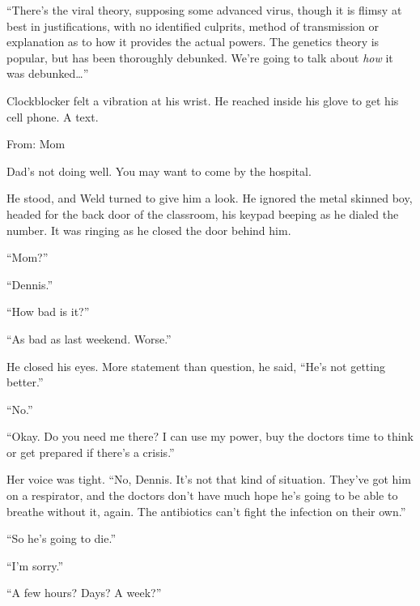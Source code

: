 ``There's the viral theory, supposing some advanced virus, though it is flimsy at best in justifications, with no identified culprits, method of transmission or explanation as to how it provides the actual powers.  The genetics theory is popular, but has been thoroughly debunked.  We're going to talk about \emph{how} it was debunked\ldots''



Clockblocker felt a vibration at his wrist.  He reached inside his glove to get his cell phone.  A text.



From: Mom



Dad's not doing well.  You may want to come by the hospital.



He stood, and Weld turned to give him a look.  He ignored the metal skinned boy, headed for the back door of the classroom, his keypad beeping as he dialed the number.  It was ringing as he closed the door behind him.



``Mom?''



``Dennis.''



``How bad is it?''



``As bad as last weekend.  Worse.''



He closed his eyes.  More statement than question, he said, ``He's not getting better.''



``No.''



``Okay.  Do you need me there?  I can use my power, buy the doctors time to think or get prepared if there's a crisis.''



Her voice was tight.  ``No, Dennis.  It's not that kind of situation.  They've got him on a respirator, and the doctors don't have much hope he's going to be able to breathe without it, again.  The antibiotics can't fight the infection on their own.''



``So he's going to die.''



``I'm sorry.''



``A few hours?  Days?  A week?''



